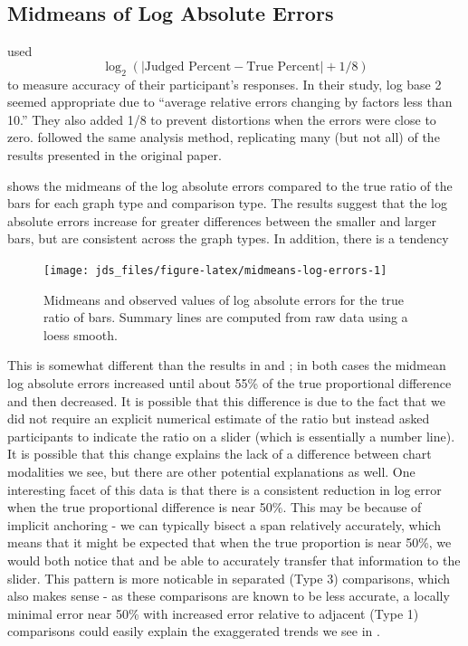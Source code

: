 \documentclass[letterpaper,inpress,dvipsnames]{jdsart}
\begin{document}
\hypertarget{midmeans-of-log-absolute-errors}{%
\subsection{Midmeans of Log Absolute Errors}\label{midmeans-of-log-absolute-errors}}

\citeauthor{clevelandGraphical1984} used
\[\log_2(|\text{Judged Percent} - \text{True Percent}|+1/8)\]
to measure accuracy of their participant's responses.
In their study, log base 2 seemed appropriate due to ``average relative errors changing by factors less than 10.''
They also added 1/8 to prevent distortions when the errors were close to zero.
\citet{heerCrowdsourcingGraphicalPerception2010b} followed the same analysis method, replicating many (but not all) of the results presented in the original paper.

 shows the midmeans of the log absolute errors compared to the true ratio of the bars for each graph type and comparison type.
The results suggest that the log absolute errors increase for greater differences between the smaller and larger bars, but are consistent across the graph types. In addition, there is a tendency

\begin{figure}
\texttt{[image: jds\_files/figure-latex/midmeans-log-errors-1]} \caption{Midmeans and observed values of log absolute errors for the true ratio of bars. Summary lines are computed from raw data using a loess smooth.}\label{fig:midmeans-log-errors}
\end{figure}

This is somewhat different than the results in \citet{clevelandGraphical1984} and \citet{heerCrowdsourcingGraphicalPerception2010b}; in both cases the midmean log absolute errors increased until about 55\% of the true proportional difference and then decreased.
It is possible that this difference is due to the fact that we did not require an explicit numerical estimate of the ratio but instead asked participants to indicate the ratio on a slider (which is essentially a number line).
It is possible that this change explains the lack of a difference between chart modalities we see, but there are other potential explanations as well.
One interesting facet of this data is that there is a consistent reduction in log error when the true proportional difference is near 50\%.
This may be because of implicit anchoring - we can typically bisect a span relatively accurately, which means that it might be expected that when the true proportion is near 50\%, we would both notice that and be able to accurately transfer that information to the slider.
This pattern is more noticable in separated (Type 3) comparisons, which also makes sense - as these comparisons are known to be less accurate, a locally minimal error near 50\% with increased error relative to adjacent (Type 1) comparisons could easily explain the exaggerated trends we see in .
\end{document}
